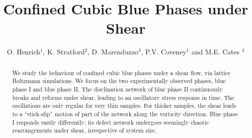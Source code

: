 \documentclass[12pt,twoside]{iopart}
\begin{document}
\title[]{Confined Cubic Blue Phases under Shear}
\author{O. Henrich$^{1}$, K. Stratford$^2$, D. Marenduzzo$^3$, P.V. Coveney$^1$ and M.E. Cates $^3$}

\address{$^1$ Centre for Computational Science, University College London, UK\\$^2$ Edinburgh Parallel Computing Centre, University of Edinburgh, UK\\$^3$ School of Physics and Astronomy, University of Edinburgh, UK}

\begin{abstract}
We study the behaviour of confined cubic blue phases under a shear flow, via lattice Boltzmann simulations. We focus on the two experimentally observed
phases, blue phase I and blue phase II. The disclination network of blue phase II continuously breaks and reforms under shear, 
leading to an oscillatory stress response in time. The oscillations are only regular for very thin samples. For thicker samples, the shear leads to a ``stick-slip'' motion
of part of the network along the vorticity direction. Blue phase I responds vastly differently: its defect network undergoes seemingly
chaotic rearrangements under shear, irrespective of system size. 
\end{abstract}

\end{document}
